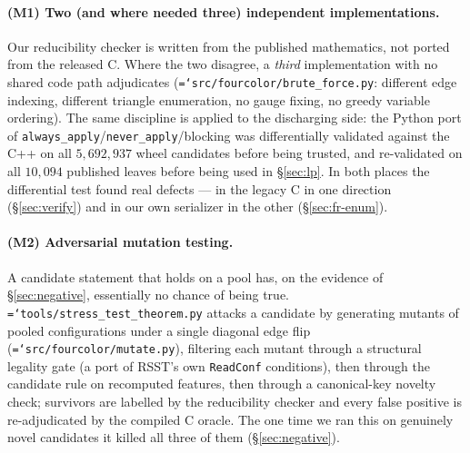 \documentclass[11pt]{article}
\theoremstyle{definition}
\newcommand{\art}[1]{{\texttt{\hyphenchar\font=`\-\relax #1}}}
\begin{document}
\paragraph{(M1) Two (and where needed three) independent implementations.} Our
reducibility checker is written from the published mathematics, not ported from the
released C. Where the two disagree, a \emph{third} implementation with no shared
code path adjudicates (\art{src/fourcolor/brute\_force.py}: different edge indexing,
different triangle enumeration, no gauge fixing, no greedy variable ordering). The
same discipline is applied to the discharging side: the Python port of
\texttt{always\_apply}/\texttt{never\_apply}/blocking was differentially validated
against the C++ on all $5{,}692{,}937$ wheel candidates before being trusted, and
re-validated on all $10{,}094$ published leaves before being used in
\S\ref{sec:lp}. In both places the differential test found real defects --- in the
legacy C in one direction (\S\ref{sec:verify}) and in our own serializer in the other
(\S\ref{sec:fr-enum}).

\paragraph{(M2) Adversarial mutation testing.} A candidate statement that holds on a
pool has, on the evidence of \S\ref{sec:negative}, essentially no chance of being
true. \art{tools/stress\_test\_theorem.py} attacks a candidate by generating mutants
of pooled configurations under a single diagonal edge flip
(\art{src/fourcolor/mutate.py}), filtering each mutant through a structural legality
gate (a port of RSST's own \texttt{ReadConf} conditions), then through the candidate
rule on recomputed features, then through a canonical-key novelty check; survivors
are labelled by the reducibility checker and every false positive is re-adjudicated
by the compiled C oracle. The one time we ran this on genuinely novel candidates it
killed all three of them (\S\ref{sec:negative}).
\end{document}
